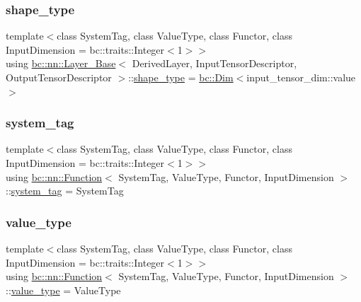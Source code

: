 \mbox{\label{structbc_1_1nn_1_1Function_ab8cbdaad20a0270b2555a91676a79932}} 
\subsubsection{\texorpdfstring{shape\+\_\+type}{shape\_type}}
{\footnotesize\ttfamily template$<$class System\+Tag, class Value\+Type, class Functor, class Input\+Dimension = bc\+::traits\+::\+Integer$<$1$>$$>$ \\
using \hyperlink{structbc_1_1nn_1_1Layer__Base}{bc\+::nn\+::\+Layer\+\_\+\+Base}$<$ Derived\+Layer, Input\+Tensor\+Descriptor, Output\+Tensor\+Descriptor $>$\+::\hyperlink{structbc_1_1nn_1_1Function_ab8cbdaad20a0270b2555a91676a79932}{shape\+\_\+type} =  \hyperlink{structbc_1_1Dim}{bc\+::\+Dim}$<$input\+\_\+tensor\+\_\+dim\+::value$>$}

\mbox{\label{structbc_1_1nn_1_1Function_a7882db6732a438adaa9724bd80f57c13}} 
\subsubsection{\texorpdfstring{system\+\_\+tag}{system\_tag}}
{\footnotesize\ttfamily template$<$class System\+Tag, class Value\+Type, class Functor, class Input\+Dimension = bc\+::traits\+::\+Integer$<$1$>$$>$ \\
using \hyperlink{structbc_1_1nn_1_1Function}{bc\+::nn\+::\+Function}$<$ System\+Tag, Value\+Type, Functor, Input\+Dimension $>$\+::\hyperlink{structbc_1_1nn_1_1Function_a7882db6732a438adaa9724bd80f57c13}{system\+\_\+tag} =  System\+Tag}

\mbox{\label{structbc_1_1nn_1_1Function_a960ffb695c734f905e72c911ee6f8b88}} 
\subsubsection{\texorpdfstring{value\+\_\+type}{value\_type}}
{\footnotesize\ttfamily template$<$class System\+Tag, class Value\+Type, class Functor, class Input\+Dimension = bc\+::traits\+::\+Integer$<$1$>$$>$ \\
using \hyperlink{structbc_1_1nn_1_1Function}{bc\+::nn\+::\+Function}$<$ System\+Tag, Value\+Type, Functor, Input\+Dimension $>$\+::\hyperlink{structbc_1_1nn_1_1Function_a960ffb695c734f905e72c911ee6f8b88}{value\+\_\+type} =  Value\+Type}




